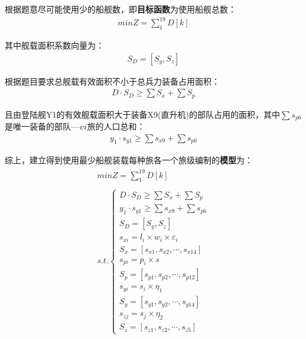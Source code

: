 \documentclass{whutmod}
\begin{document}
	    
	    根据题意尽可能使用少的船舰数，即\textbf{目标函数}为使用船舰总数：
	     \begin{gather}
	    min Z=\sum _{1}^{19}D[k]
	  \end{gather}
	    
	    
	   其中舰载面积系数向量为：
	    \begin{gather*}
	    S_{D}=[S_{y}, S_{z}]
    	\end{gather*}
    	
    	根据题目要求总舰载有效面积不小于总兵力装备占用面积：
    	 \begin{gather*}
    	 D\cdot S_{D}\geq \sum  S_{x} + \sum  S_{p}
    	 \end{gather*}
    	 
    	 且由登陆舰Y1的有效舰载面积大于装备X9(直升机)的部队占用的面积，其中$\sum  s_{p6}$是唯一装备的部队—$\uppercase\expandafter{\romannumeral6}$旅的人口总和：
    	  \begin{gather*}
    	 y_{1}\cdot s_{y1}\geq \sum s_{x9}+ \sum  s_{p6}
    	 \end{gather*}
    	 
    	 

    	 综上，建立得到使用最少船舰装载每种旅各一个旅级编制的\textbf{模型}为：
    	  \begin{gather}
\begin{matrix}
minZ=\sum _{1}^{19}D[k]
\\
\\
s.t.\left\{\begin{matrix}	 D\cdot S_{D}\geq \sum  S_{x} + \sum  S_{p}
\\ y_{1}\cdot s_{y1}\geq \sum s_{x9}+ \sum  s_{p6}
\\S_{D}=[S_{y}, S_{z}]
\\ s_{xi}=l_{i}\times w_{i} \times \varepsilon _{i}
\\S_{x}=[s_{x1},s_{x2},\cdots,s_{x14}]
\\s_{pi}=p_{i}\times s
\\S_{p}=[s_{p1},s_{p2},\cdots,s_{p12}]
\\     s_{yi}=s_{i}\times \eta_{1}
\\   S_{y}=[s_{y1},s_{y2},\cdots,s_{y14}]
\\      s_{zj}=s_{j}\times \eta_{2}
\\ S_{z}=[s_{z1},s_{z2},\cdots,s_{z5}]
\end{matrix}\right.
\end{matrix}
     	 \end{gather}
\end{document}
